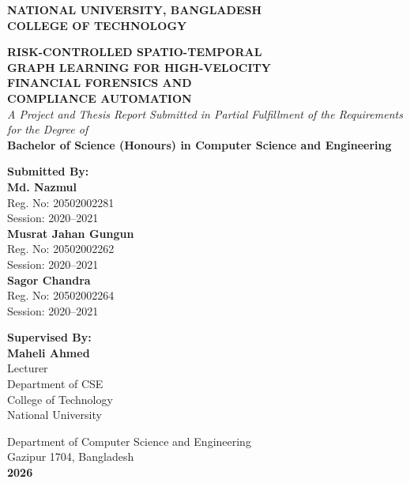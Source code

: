 \begin{titlepage}
\begin{center}
   \vspace*{0.5cm}
   {\Large\textbf{NATIONAL UNIVERSITY, BANGLADESH}}\\[0.3cm]
   {\large\textbf{COLLEGE OF TECHNOLOGY}}\\[0.8cm]
   \vspace*{0.8cm}
   
   {\Large\textbf{RISK-CONTROLLED SPATIO-TEMPORAL\\[0.25cm]
   GRAPH LEARNING FOR HIGH-VELOCITY\\[0.25cm]
   FINANCIAL FORENSICS AND\\[0.25cm]
   COMPLIANCE AUTOMATION}}\\[1.0cm]
   
   \textit{A Project and Thesis Report Submitted in Partial Fulfillment of the Requirements for the Degree of}\\[0.3cm]
   {\large\textbf{Bachelor of Science (Honours) in Computer Science and Engineering}}\\[1.2cm]
   
   \begin{minipage}[t]{0.48\textwidth}
       \begin{flushleft} \large
           \textbf{Submitted By:}\\[0.2cm]
           \textbf{Md. Nazmul}\\
           Reg. No: 20502002281\\
           Session: 2020--2021\\[0.2cm]
           \textbf{Musrat Jahan Gungun}\\
           Reg. No: 20502002262\\
           Session: 2020--2021\\[0.2cm]
           \textbf{Sagor Chandra}\\
           Reg. No: 20502002264\\
           Session: 2020--2021
       \end{flushleft}
   \end{minipage}
   \hfill
   \begin{minipage}[t]{0.48\textwidth}
       \begin{flushright} \large
           \textbf{Supervised By:}\\[0.2cm]
           \textbf{Maheli Ahmed}\\
           Lecturer\\
           Department of CSE\\
           College of Technology\\
           National University
       \end{flushright}
   \end{minipage}
   
   \vfill
   {\large Department of Computer Science and Engineering\\
   Gazipur 1704, Bangladesh\\
   \textbf{2026}}
\end{center}
\end{titlepage}
